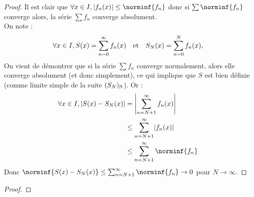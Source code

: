 \documentclass[french]{article}
\begin{document}
\begin{proof}
Il est clair que $\forall x \in I, \abs{f_n(x)} \leq \norminf{f_n}$ donc si $\sum \norminf{f_n}$ converge alors, la série $\sum f_n$ converge
absolument. \\
On note : 
\[ \forall x \in I, S(x) = \sum_{n=0}^{\infty} f_n(x) \quad \text{et} \quad S_N(x) = \sum_{n=0}^N f_n(x) ,\]
On vient de démontrer que si la série $\sum f_n$ converge normalement, alors elle converge absolument (et donc simplement), ce qui
implique que $S$ est bien définie (comme limite simple de la suite $(S_N)_{\mathbb{N}}$). Or :
\begin{align*}
\forall x \in I, \abs{S(x) - S_N(x)} & = \abs*{ \sum_{n=N+1}^{\infty} f_n(x) } \\
& \leq  \sum_{n=N+1}^{\infty}  \abs{f_n(x)} \\
& \leq \sum_{n=N+1}^{\infty} \norminf{f_n}
\end{align*}
Donc $\norminf{S(x) - S_N(x)} \leq \sum_{n=N+1}^{\infty} \norminf{f_n} \to 0$ pour $N \to \infty$.
\end{proof}

\begin{thm}

\end{thm}

\begin{proof}

\end{proof}
\end{document}
